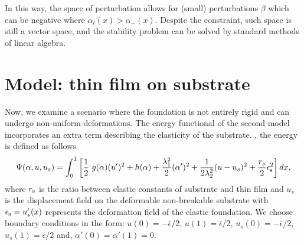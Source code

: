% 
In this way, the space of perturbation allows for (small) perturbations $\beta$ which can be negative where $\alpha_t(x)>\alpha_-(x)$. Despite the constraint, such space is still a vector space, and the stability problem can be solved by standard methods of linear algebra.

\section{Model: thin film  on   substrate }
\label{sec:non-rigid}

Now, we examine a scenario where the foundation is not entirely rigid and can undergo non-uniform deformations. The energy functional of the second model incorporates an extra term describing the elasticity of the substrate. , the energy is defined as follows
\begin{equation}
\label{model_elastic_substrate}
\Psi(\alpha, u,u_s) = \int_{0}^1 \left[ \frac{1}{2} \ g(\alpha)(u')^2 + h(\alpha) + \frac{\lambda_1^2}{2}(\alpha')^2 
+ \frac{1}{2 \lambda_2^2} (u-u_s)^2 
+ \frac{r_{s}}{2}  \epsilon_{\rm s}^2 \right] dx,
\end{equation}
where $r_{\rm s}$ is the ratio between elastic constants of substrate and thin film and $u_s$ is the displacement field on the deformable non-breakable substrate with $\epsilon_{\rm s}=u_s'(x)$ represents the deformation field of the elastic foundation. We  choose boundary conditions in the form: $u(0)=-\bar\epsilon/2$, $u(1)=\bar\epsilon/2$,  $u_s(0)=-\bar\epsilon/2$, $u_s(1)=\bar\epsilon/2$ and, $\alpha'(0)=\alpha'(1)=0$. 

